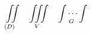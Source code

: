 \documentclass{article}
\newcommand{\iiint}[1]{\int\!\!\!\int\limits_{#1}\!\!\!\int}
\newcommand{\iint}[1]{\int\!\!\!\int\limits_{\hspace{-1em}#1}}
\newcommand{\idotsint}[1]{\int\cdots\int_{\hspace{-1.8em}#1}}
\begin{document}
\[ \iint{(D)}\quad\iiint{V}\quad\idotsint{G} \]
\end{document}
